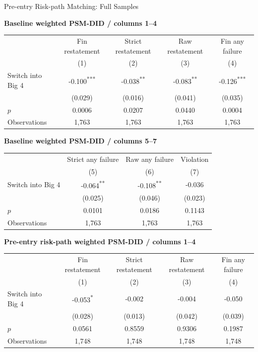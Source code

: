 \documentclass[10pt]{article}
\newcommand{\sym}[1]{\textsuperscript{#1}}
\begin{document}
\fontsize{10}{12}\selectfont
\setlength{\tabcolsep}{3pt}\renewcommand{\arraystretch}{1.15}
\begin{center}\large Pre-entry Risk-path Matching: Full Samples\end{center}
\medskip\textbf{Baseline weighted PSM-DID / columns 1--4}\par\smallskip
\begin{tabular*}{\textwidth}{@{\extracolsep{\fill}}lcccc@{}}
\toprule
 & Fin restatement & Strict restatement & Raw restatement & Fin any failure \\
 & (1) & (2) & (3) & (4) \\
\midrule
Switch into Big 4 & -0.100\sym{***} & -0.038\sym{**} & -0.083\sym{**} & -0.126\sym{***} \\
 & (0.029) & (0.016) & (0.041) & (0.035) \\
$p$ & 0.0006 & 0.0207 & 0.0440 & 0.0004 \\
Observations & 1,763 & 1,763 & 1,763 & 1,763 \\
\bottomrule\end{tabular*}\par
\medskip\textbf{Baseline weighted PSM-DID / columns 5--7}\par\smallskip
\begin{tabular*}{\textwidth}{@{\extracolsep{\fill}}lccc@{}}
\toprule
 & Strict any failure & Raw any failure & Violation \\
 & (5) & (6) & (7) \\
\midrule
Switch into Big 4 & -0.064\sym{**} & -0.108\sym{**} & -0.036 \\
 & (0.025) & (0.046) & (0.023) \\
$p$ & 0.0101 & 0.0186 & 0.1143 \\
Observations & 1,763 & 1,763 & 1,763 \\
\bottomrule\end{tabular*}\par
\medskip\textbf{Pre-entry risk-path weighted PSM-DID / columns 1--4}\par\smallskip
\begin{tabular*}{\textwidth}{@{\extracolsep{\fill}}lcccc@{}}
\toprule
 & Fin restatement & Strict restatement & Raw restatement & Fin any failure \\
 & (1) & (2) & (3) & (4) \\
\midrule
Switch into Big 4 & -0.053\sym{*} & -0.002 & -0.004 & -0.050 \\
 & (0.028) & (0.013) & (0.042) & (0.039) \\
$p$ & 0.0561 & 0.8559 & 0.9306 & 0.1987 \\
Observations & 1,748 & 1,748 & 1,748 & 1,748 \\
\bottomrule\end{tabular*}\par
\end{document}

